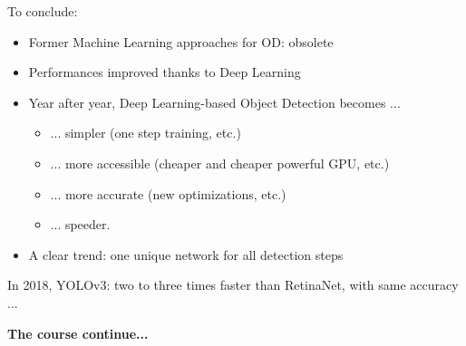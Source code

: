\documentclass{beamer}[10pt, usepdftitle=false, handout]
\begin{document}
     \begin{frame}
     
     To conclude:
		\vspace*{1em}  
     
		\begin{itemize}
			
			\item{Former Machine Learning approaches for OD: obsolete}    
		 	\item{Performances improved thanks to Deep Learning}
			\item{Year after year, Deep Learning-based Object Detection becomes ...
				\begin{itemize}
					\item{... simpler (one step training, etc.)}		
					\item{... more accessible (cheaper and cheaper powerful GPU, etc.)}
					\item{... more accurate (new optimizations, etc.)} 
					\item{... speeder.}
				\end{itemize}}
			\item{A clear trend: one unique network for all detection steps}
		\end{itemize}
		\vspace*{1em}

		In 2018, YOLOv3: two to three times faster than RetinaNet, with same accuracy ... 
		\vspace*{1em}

		\textbf{The course continue...}
		
	\end{frame}  
    
	    
    
	
\end{document}
